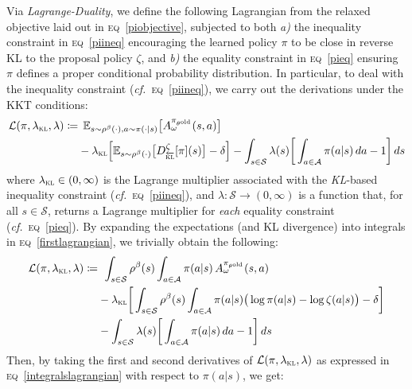 Via \emph{Lagrange-Duality}, we define the following Lagrangian from the relaxed objective
laid out in \textsc{eq}~\ref{piobjective}, subjected to both
\textit{a)} the inequality constraint in \textsc{eq}~\ref{piineq}
encouraging the learned policy $\pi$ to be close in reverse KL to
the proposal policy $\zeta$, and
\textit{b)} the equality constraint in \textsc{eq}~\ref{pieq}
ensuring $\pi$ defines a proper conditional probability distribution.
In particular, to deal with the inequality constraint (\textit{cf.}~\textsc{eq}~\ref{piineq}),
we carry out the derivations under the KKT conditions:
\begin{align}
  \mathcal{L}(\pi, \lambda_\textsc{kl}, \lambda) \coloneqq
  & \;\, \mathbb{E}_{s \sim \rho^\beta(\cdot), a \sim \pi(\cdot | s)}
  \big[A^{\pi_{\theta^\text{old}}}_\omega(s,a)\big] \nonumber \\
  &- \lambda_\textsc{kl}
  \Big[
  \mathbb{E}_{s \sim \rho^\beta(\cdot)}\big[D^\zeta_{\overleftarrow{\textsc{kl}}}[\pi](s)\big] - \delta
  \Big]
  - \int_{s \in \mathcal{S}} \lambda(s)
  \bigg[
  \int_{a \in \mathcal{A}} \pi(a | s) \, da - 1
  \bigg]
  \, ds
  \label{firstlagrangian}
\end{align}
where $\lambda_\textsc{kl} \in (0, \infty)$ is the Lagrange multiplier associated with
the \textit{KL}-based inequality constraint (\textit{cf.}~\textsc{eq}~\ref{piineq}),
and $\lambda: \mathcal{S} \to (0, \infty)$ is a function that, for all $s \in \mathcal{S}$,
returns a Lagrange multiplier for \emph{each} equality constraint (\textit{cf.}~\textsc{eq}~\ref{pieq}).
By expanding the expectations (and KL divergence)
into integrals in \textsc{eq}~\ref{firstlagrangian}, we trivially obtain
the following:
\begin{align}
  \mathcal{L}(\pi, \lambda_\textsc{kl}, \lambda) \coloneqq
  & \;\, \int_{s \in \mathcal{S}} \rho^\beta(s) \int_{a \in \mathcal{A}} \pi(a | s) \,
  A^{\pi_{\theta^\text{old}}}_\omega(s,a) \nonumber \\
  &- \lambda_\textsc{kl}
  \bigg[
  \int_{s \in \mathcal{S}} \rho^\beta(s) \int_{a \in \mathcal{A}} \pi(a | s)
  \big(
  \log \pi(a | s) - \log \zeta(a | s)
  \big)
  - \delta
  \bigg] \nonumber \\
  &- \int_{s \in \mathcal{S}} \lambda(s)
  \bigg[
  \int_{a \in \mathcal{A}} \pi(a | s) \, da - 1
  \bigg]
  \, ds
  \label{integralslagrangian}
\end{align}
Then, by taking the first and second derivatives of $\mathcal{L}(\pi, \lambda_\textsc{kl}, \lambda)$ as
expressed in \textsc{eq}~\ref{integralslagrangian} with respect to $\pi(a | s)$, we get:
